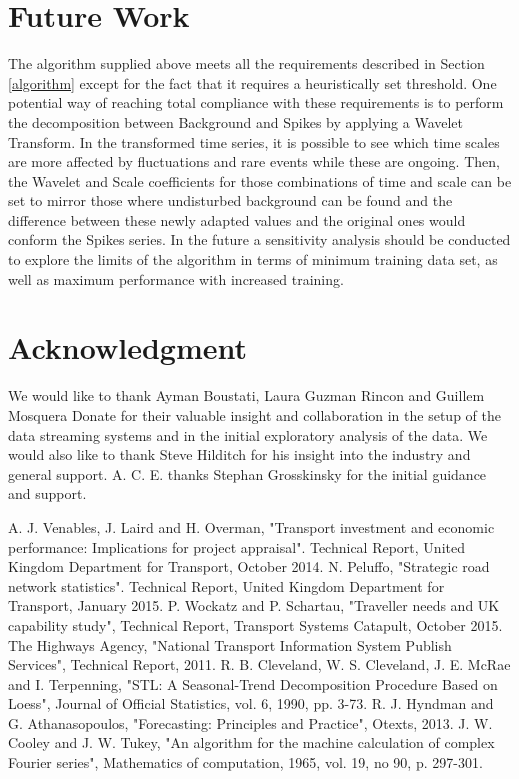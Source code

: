 \documentclass[conference]{IEEEtran}
\begin{document}
\section{Future Work}
The algorithm supplied above meets all the requirements described in Section \ref{algorithm} except for the fact that it requires a heuristically set threshold. 
One potential way of reaching total compliance with these requirements is to perform the decomposition between Background and Spikes by applying a Wavelet Transform. In the transformed time series, it is possible to see which time scales are more affected by fluctuations and rare events while these are ongoing. Then, the Wavelet and Scale coefficients for those combinations of time and scale can be set to mirror those where undisturbed background can be found and the difference between these newly adapted values and the original ones would conform the Spikes series.
In the future a sensitivity analysis should be conducted to explore the limits of the algorithm in terms of minimum training data set, as well as maximum performance with increased training.
\section*{Acknowledgment}

We would like to thank Ayman Boustati, Laura Guzman Rincon and Guillem Mosquera Donate for their valuable insight and collaboration in the setup of the data streaming systems and in the initial exploratory analysis of the data. We would also like to thank Steve Hilditch for his insight into the industry and general support. A. C. E. thanks Stephan Grosskinsky for the initial guidance and support.


\begin{thebibliography}{00}
 A. J. Venables, J. Laird and H. Overman, "Transport investment and economic performance: Implications for project appraisal". Technical Report, United Kingdom Department for Transport, October 2014.
 N. Peluffo, "Strategic road network statistics". Technical Report, United Kingdom Department for Transport, January 2015.
 P. Wockatz and P. Schartau, "Traveller needs and UK capability study", Technical Report, Transport Systems Catapult, October 2015.
 The Highways Agency, "National Transport Information System Publish Services", Technical Report, 2011. 
 R. B. Cleveland, W. S. Cleveland, J. E. McRae and I. Terpenning, "STL: A Seasonal-Trend Decomposition Procedure Based on Loess", Journal of Official Statistics, vol. 6, 1990, pp. 3-73.
 R. J. Hyndman and G. Athanasopoulos, "Forecasting: Principles and Practice", Otexts, 2013.
 J. W. Cooley and J. W. Tukey, "An algorithm for the machine calculation of complex Fourier series", Mathematics of computation, 1965, vol. 19, no 90, p. 297-301.

\end{thebibliography}
\end{document}
